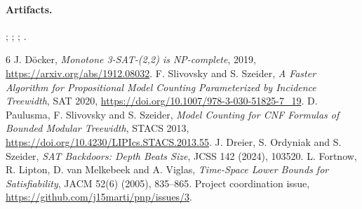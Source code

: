 \documentclass[11pt]{article}
\begin{document}
\paragraph{Artifacts.}
;
;
;
.

\begin{thebibliography}{6}
 J. D\"ocker, \emph{Monotone 3-SAT-(2,2) is NP-complete}, 2019, \url{https://arxiv.org/abs/1912.08032}.
 F. Slivovsky and S. Szeider, \emph{A Faster Algorithm for Propositional Model Counting Parameterized by Incidence Treewidth}, SAT 2020, \url{https://doi.org/10.1007/978-3-030-51825-7_19}.
 D. Paulusma, F. Slivovsky and S. Szeider, \emph{Model Counting for CNF Formulas of Bounded Modular Treewidth}, STACS 2013, \url{https://doi.org/10.4230/LIPIcs.STACS.2013.55}.
 J. Dreier, S. Ordyniak and S. Szeider, \emph{SAT Backdoors: Depth Beats Size}, JCSS 142 (2024), 103520.
 L. Fortnow, R. Lipton, D. van Melkebeek and A. Viglas, \emph{Time-Space Lower Bounds for Satisfiability}, JACM 52(6) (2005), 835--865.
 Project coordination issue, \url{https://github.com/j15marti/pnp/issues/3}.
\end{thebibliography}
\end{document}
